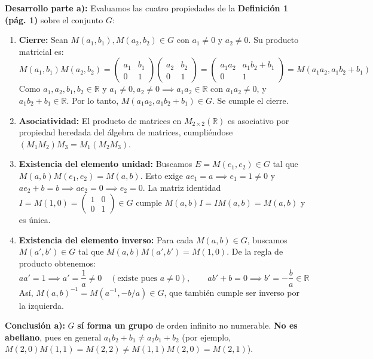 \documentclass[11pt, a4paper]{article}
\begin{document}
\noindent \textbf{Desarrollo parte a):} Evaluamos las cuatro propiedades de la \textbf{Definición 1 (pág. 1)} sobre el conjunto $G$:
\begin{enumerate}[label=\textbf{G\arabic*.}]
    \item \textbf{Cierre:} Sean $M(a_1, b_1), M(a_2, b_2) \in G$ con $a_1 \neq 0$ y $a_2 \neq 0$. Su producto matricial es:
    \[
    M(a_1, b_1) M(a_2, b_2) = \begin{pmatrix} a_1 & b_1 \\ 0 & 1 \end{pmatrix} \begin{pmatrix} a_2 & b_2 \\ 0 & 1 \end{pmatrix} = \begin{pmatrix} a_1 a_2 & a_1 b_2 + b_1 \\ 0 & 1 \end{pmatrix} = M(a_1 a_2, a_1 b_2 + b_1)
    \]
    Como $a_1, a_2, b_1, b_2 \in \mathbb{R}$ y $a_1 \neq 0, a_2 \neq 0 \implies a_1 a_2 \in \mathbb{R}$ con $a_1 a_2 \neq 0$, y $a_1 b_2 + b_1 \in \mathbb{R}$. Por lo tanto, $M(a_1 a_2, a_1 b_2 + b_1) \in G$. Se cumple el cierre.
    \item \textbf{Asociatividad:} El producto de matrices en $M_{2\times 2}(\mathbb{R})$ es asociativo por propiedad heredada del álgebra de matrices, cumpliéndose $(M_1 M_2) M_3 = M_1 (M_2 M_3)$.
    \item \textbf{Existencia del elemento unidad:} Buscamos $E = M(e_1, e_2) \in G$ tal que $M(a,b) M(e_1, e_2) = M(a,b)$. Esto exige $a e_1 = a \implies e_1 = 1 \neq 0$ y $a e_2 + b = b \implies a e_2 = 0 \implies e_2 = 0$. La matriz identidad $I = M(1,0) = \begin{pmatrix} 1 & 0 \\ 0 & 1 \end{pmatrix} \in G$ cumple $M(a,b)I = IM(a,b) = M(a,b)$ y es única.
    \item \textbf{Existencia del elemento inverso:} Para cada $M(a,b) \in G$, buscamos $M(a', b') \in G$ tal que $M(a,b)M(a',b') = M(1,0)$. De la regla de producto obtenemos:
    \[
    a a' = 1 \implies a' = \frac{1}{a} \neq 0 \quad (\text{existe pues } a \neq 0), \qquad a b' + b = 0 \implies b' = -\frac{b}{a} \in \mathbb{R}
    \]
    Así, $M(a,b)^{-1} = M(a^{-1}, -b/a) \in G$, que también cumple ser inverso por la izquierda.
\end{enumerate}
\textbf{Conclusión a):} $G$ \textbf{sí forma un grupo} de orden infinito no numerable. \textbf{No es abeliano}, pues en general $a_1 b_2 + b_1 \neq a_2 b_1 + b_2$ (por ejemplo, $M(2,0)M(1,1) = M(2,2) \neq M(1,1)M(2,0) = M(2,1)$).
\end{document}
